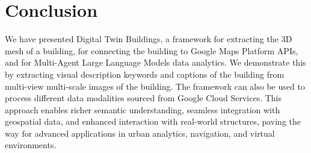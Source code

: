 \section{Conclusion}
We have presented Digital Twin Buildings, a framework for extracting the 3D mesh of a building, for connecting the building to Google Maps Platform APIs, and for Multi-Agent Large Language Models data analytics. We demonstrate this by extracting visual description keywords and captions of the building from multi-view multi-scale images of the building. The framework can also be used to process different data modalities sourced from Google Cloud Services. This approach enables richer semantic understanding, seamless integration with geospatial data, and enhanced interaction with real-world structures, paving the way for advanced applications in urban analytics, navigation, and virtual environments.
